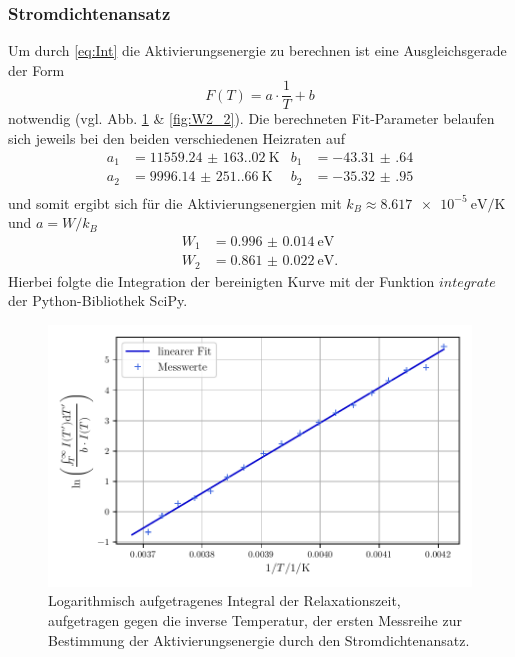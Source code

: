 \subsubsection{Stromdichtenansatz}
Um durch \autoref{eq:Int} die Aktivierungsenergie zu berechnen ist eine Ausgleichsgerade der Form
\begin{equation*}
    F(T) = a \cdot \frac{1}{T} + b
\end{equation*}
notwendig (vgl. Abb. \ref{fig:W2_1} \& \ref{fig:W2_2}).
Die berechneten Fit-Parameter belaufen sich jeweils bei den beiden verschiedenen Heizraten auf
\begin{align}
    a_1 &= \qty{11559.24(163.02)}{\kelvin} & b_1 &= \num{-43.31(64)} \\
    a_2 &= \qty{9996.14(251.66)}{\kelvin} & b_2 &= \num{-35.32(95)} \\
\end{align}
und somit ergibt sich für die Aktivierungsenergien mit $k_B \approx \qty{8,617e-5}{\electronvolt\per\kelvin}$
und $a = W/k_B$ 
\begin{align}
    W_1 &= \qty{0.996(14)}{\electronvolt} \\
    W_2 &= \qty{0.861(22)}{\electronvolt}.
\end{align}
Hierbei folgte die Integration der bereinigten Kurve mit der Funktion $integrate$
der Python-Bibliothek SciPy\cite{scipy}.
\begin{figure}
    \centering
    \includegraphics[width=0.7\linewidth]{scripts/build/plot1_2.pdf}
    \caption{Logarithmisch aufgetragenes Integral der Relaxationszeit, aufgetragen gegen die inverse Temperatur, der ersten Messreihe zur Bestimmung der Aktivierungsenergie durch den Stromdichtenansatz.}
    \label{fig:W2_1}
\end{figure}
